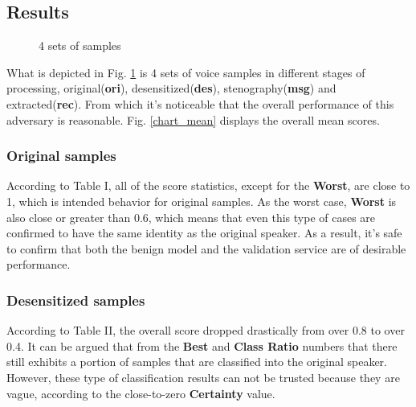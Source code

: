 \documentclass[journal]{IEEEtran} %
\begin{document}
\subsection{Results}

\begin{figure}[tb]
    \caption{4 sets of samples}
    \label{samp1}
\end{figure}

What is depicted in Fig. \ref{samp1} is 4 sets of voice samples in different stages of processing, original(\textbf{ori}), desensitized(\textbf{des}), stenography(\textbf{msg}) and extracted(\textbf{rec}). From which it's noticeable that the overall performance of this adversary is reasonable. Fig. \ref{chart_mean} displays the overall mean scores.
\subsubsection{Original samples}

According to Table I, all of the score statistics, except for the \textbf{Worst}, are close to 1, which is intended behavior for original samples. As the worst case, \textbf{Worst} is also close or greater than 0.6, which means that even this type of cases are confirmed to have the same identity as the original speaker. As a result, it's safe to confirm that both the benign model and the validation service are of desirable performance.

\subsubsection{Desensitized samples}

According to Table II, the overall score dropped drastically from over 0.8 to over 0.4. It can be argued that from the \textbf{Best} and \textbf{Class Ratio} numbers that there still exhibits a portion of samples that are classified into the original speaker. However, these type of classification results can not be trusted because they are vague, according to the close-to-zero \textbf{Certainty} value.
\end{document}

